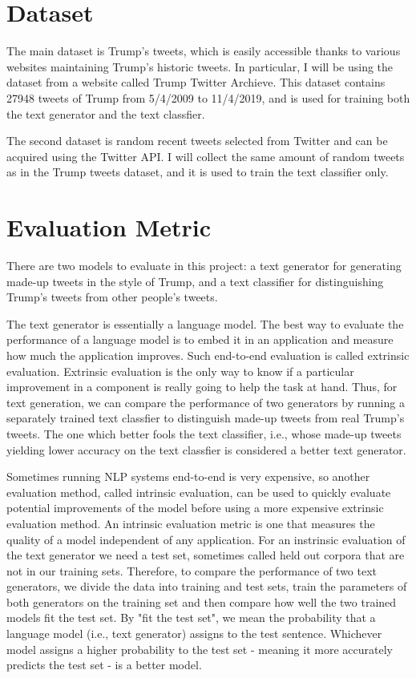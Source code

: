 \documentclass{article}
\begin{document}
\section{Dataset}
The main dataset is Trump's tweets, which is easily accessible thanks to various websites maintaining Trump's historic tweets. In particular, I will be using the dataset from a website called Trump Twitter Archieve. This dataset contains 27948 tweets of Trump from 5/4/2009 to 11/4/2019, and is used for training both the text generator and the text classfier.

The second dataset is random recent tweets selected from Twitter and can be acquired using the Twitter API. I will collect the same amount of random tweets as in the Trump tweets dataset, and it is used to train the text classifier only. 
\section{Evaluation Metric}
There are two models to evaluate in this project: a text generator for generating made-up tweets in the style of Trump, and a text classifier for distinguishing Trump's tweets from other people's tweets.

The text generator is essentially a language model. The best way to evaluate the performance of a language model is to embed it in an application and measure how much the application improves. Such end-to-end evaluation is called extrinsic evaluation. Extrinsic evaluation is the only way to know if a particular improvement in a component is really going to help the task at hand. Thus, for text generation, we can compare the performance of two generators by running a separately trained text classfier to distinguish made-up tweets from real Trump's tweets. The one which better fools the text classifier, i.e., whose made-up tweets yielding lower accuracy on the text classfier is considered a better text generator.

Sometimes running NLP systems end-to-end is very expensive, so another evaluation method, called intrinsic evaluation, can be used to quickly evaluate potential improvements of the model before using a more expensive extrinsic evaluation method. An intrinsic evaluation metric is one that measures the quality of a model independent of any application. For an instrinsic evaluation of the text generator we need a test set, sometimes called held out corpora that are not in our training sets. Therefore, to compare the performance of two text generators, we divide the data into training and test sets, train the parameters of both generators on the training set and then compare how well the two trained models fit the test set. By "fit the test set", we mean the probability that a language model (i.e., text generator) assigns to the test sentence. Whichever model assigns a higher probability to the test set - meaning it more accurately predicts the test set - is a better model. 
\end{document}
